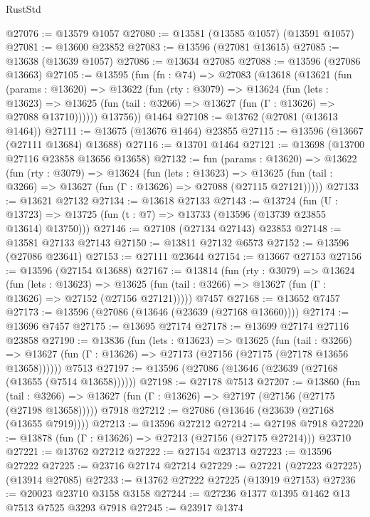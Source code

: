 \begin{lexlean}{RustStd}
\begin{coremodule}
@27076 := @13579 @1057
@27080 := @13581 (@13585 @1057) (@13591 @1057)
@27081 := @13600 @23852
@27083 := @13596 (@27081 @13615)
@27085 := @13638 (@13639 @1057)
@27086 := @13634 @27085
@27088 := @13596 (@27086 @13663)
@27105 := @13595
    (fun (fn : @74) =>
    @27083
      (@13618
        (@13621
          (fun (params : @13620) =>
          @13622
            (fun (rty : @3079) =>
            @13624
              (fun (lets : @13623) =>
              @13625 (fun (tail : @3266) => @13627 (fun (Γ : @13626) => @27088 @13710))))))
        @13756))
    @1464
@27108 := @13762 (@27081 (@13613 @1464))
@27111 := @13675 (@13676 @1464) @23855
@27115 := @13596 (@13667 (@27111 @13684) @13688)
@27116 := @13701 @1464
@27121 := @13698 (@13700 @27116 @23858 @13656 @13658)
@27132 := fun (params : @13620) =>
  @13622
    (fun (rty : @3079) =>
    @13624
      (fun (lets : @13623) =>
      @13625 (fun (tail : @3266) => @13627 (fun (Γ : @13626) => @27088 (@27115 @27121)))))
@27133 := @13621 @27132
@27134 := @13618 @27133
@27143 := @13724
    (fun (U : @13723) => @13725 (fun (t : @7) => @13733 (@13596 (@13739 @23855 @13614) @13750)))
@27146 := @27108 (@27134 @27143) @23853
@27148 := @13581 @27133 @27143
@27150 := @13811 @27132 @6573
@27152 := @13596 (@27086 @23641)
@27153 := @27111 @23644
@27154 := @13667 @27153
@27156 := @13596 (@27154 @13688)
@27167 := @13814
    (fun (rty : @3079) =>
    @13624
      (fun (lets : @13623) =>
      @13625 (fun (tail : @3266) => @13627 (fun (Γ : @13626) => @27152 (@27156 @27121)))))
    @7457
@27168 := @13652 @7457
@27173 := @13596 (@27086 (@13646 (@23639 (@27168 @13660))))
@27174 := @13696 @7457
@27175 := @13695 @27174
@27178 := @13699 @27174 @27116 @23858
@27190 := @13836
    (fun (lets : @13623) =>
    @13625
      (fun (tail : @3266) =>
      @13627 (fun (Γ : @13626) => @27173 (@27156 (@27175 (@27178 @13656 @13658))))))
    @7513
@27197 := @13596 (@27086 (@13646 (@23639 (@27168 (@13655 (@7514 @13658))))))
@27198 := @27178 @7513
@27207 := @13860
    (fun (tail : @3266) => @13627 (fun (Γ : @13626) => @27197 (@27156 (@27175 (@27198 @13658)))))
    @7918
@27212 := @27086 (@13646 (@23639 (@27168 (@13655 @7919))))
@27213 := @13596 @27212
@27214 := @27198 @7918
@27220 := @13878 (fun (Γ : @13626) => @27213 (@27156 (@27175 @27214))) @23710
@27221 := @13762 @27212
@27222 := @27154 @23713
@27223 := @13596 @27222
@27225 := @23716 @27174 @27214
@27229 := @27221 (@27223 @27225) (@13914 @27085)
@27233 := @13762 @27222 @27225 (@13919 @27153)
@27236 := @20023 @23710 @3158 @3158
@27244 := @27236 @1377 @1395 @1462 @13 @7513 @7525 @3293 @7918
@27245 := @23917 @1374

\end{coremodule}
\end{lexlean}
